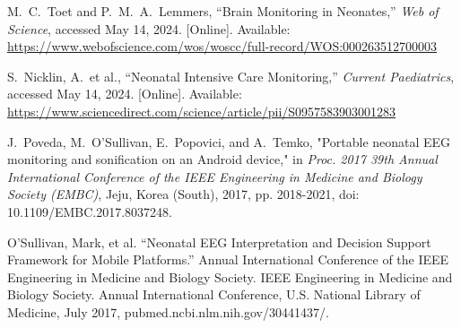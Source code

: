 \documentclass[12pt,journal,compsoc]{IEEEtran}
\begin{document}

\begin{thebibliography}{1}

M.~C.~Toet and P.~M.~A.~Lemmers, “Brain Monitoring in Neonates,” \emph{Web of Science}, accessed May 14, 2024. [Online]. Available: \url{https://www.webofscience.com/wos/woscc/full-record/WOS:000263512700003}

S.~Nicklin, A.~et al., “Neonatal Intensive Care Monitoring,” \emph{Current Paediatrics}, accessed May 14, 2024. [Online]. Available: \url{https://www.sciencedirect.com/science/article/pii/S0957583903001283}

J.~Poveda, M.~O'Sullivan, E.~Popovici, and A.~Temko, "Portable neonatal EEG monitoring and sonification on an Android device," in \emph{Proc. 2017 39th Annual International Conference of the IEEE Engineering in Medicine and Biology Society (EMBC)}, Jeju, Korea (South), 2017, pp. 2018-2021, doi: 10.1109/EMBC.2017.8037248.

O’Sullivan, Mark, et al. “Neonatal EEG Interpretation and Decision Support Framework for Mobile Platforms.” Annual International Conference of the IEEE Engineering in Medicine and Biology Society. IEEE Engineering in Medicine and Biology Society. Annual International Conference, U.S. National Library of Medicine, July 2017, pubmed.ncbi.nlm.nih.gov/30441437/. 

\end{thebibliography}




\end{document}
